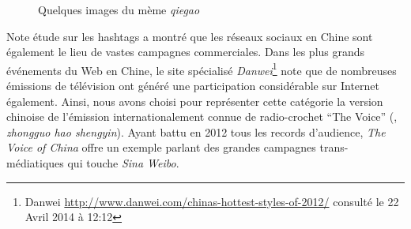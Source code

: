 \begin{figure}[htbp]
    \centering
    \caption{
      Quelques images du mème \textit{qiegao}
    }
\end{figure}

Note étude sur les hashtags a montré que les réseaux sociaux en Chine sont également le lieu de vastes campagnes commerciales. Dans les plus  grands événements du Web en Chine, le site spécialisé \textit{Danwei}\footnote{ Danwei \url{http://www.danwei.com/chinas-hottest-styles-of-2012/} consulté le 22 Avril 2014 à 12:12} note que de nombreuses émissions de télévision ont généré une participation considérable sur Internet également. Ainsi, nous avons choisi pour représenter cette catégorie la version chinoise de l'émission internationalement connue de radio-crochet ``The Voice'' (, \textit{zhongguo hao shengyin}). Ayant battu en 2012 tous les records d'audience, \textit{The Voice of China} offre un exemple parlant des grandes campagnes trans-médiatiques qui touche \textit{Sina Weibo}.

